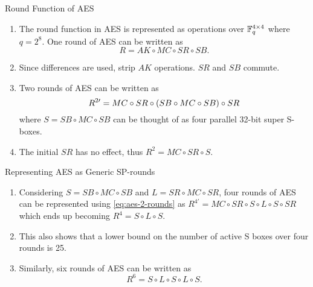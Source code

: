 \documentclass[notheorems]{beamer}
\theoremstyle{definition}
\theoremstyle{example}
\begin{document}
    \begin{frame}[<+->]{Round Function of AES}
        \begin{enumerate}
            \item The round function in AES is represented as operations over
            \(\mathbb F_q^{4 \times 4}\) where \(q = 2^8\). One round of AES can be
            written as
            \begin{equation}
                R = AK \circ MC \circ SR \circ SB.  
            \end{equation}
            \item Since differences are used, strip \(AK\) operations. \(SR\)
            and \(SB\) commute.
            \item Two rounds of AES can be written as
            \begin{equation}
                R^{2\prime} = MC \circ SR \circ (SB \circ MC \circ SB) \circ SR
                \label{eq:aes-2-rounds}
            \end{equation}
            where \(S = SB \circ MC \circ SB\) can be thought of as four
            parallel 32-bit super S-boxes. 
            \item The initial \(SR\) has no effect, thus \(R^2 = MC \circ SR
            \circ S\).
        \end{enumerate}
    \end{frame}
    
    \begin{frame}{Representing AES as Generic SP-rounds}
        \begin{enumerate}
            \item<1-> Considering \(S = SB \circ MC \circ SB\) and \(L = SR
            \circ MC \circ SR\), four rounds of AES can be represented using
            \eqref{eq:aes-2-rounds} as \(R^{4\prime} = MC \circ SR \circ S \circ
            L \circ S \circ SR\) which ends up becoming \(R^4 = S \circ L \circ
            S\).
            \item<2-> This also shows that a lower bound on the number of active
            S boxes over four rounds is 25.
            \item<4-> Similarly, six rounds of AES can be written as
            \begin{equation}
                R^6 = S \circ L \circ S \circ L \circ S.
            \end{equation}
        \end{enumerate}
    \end{frame}
\end{document}
